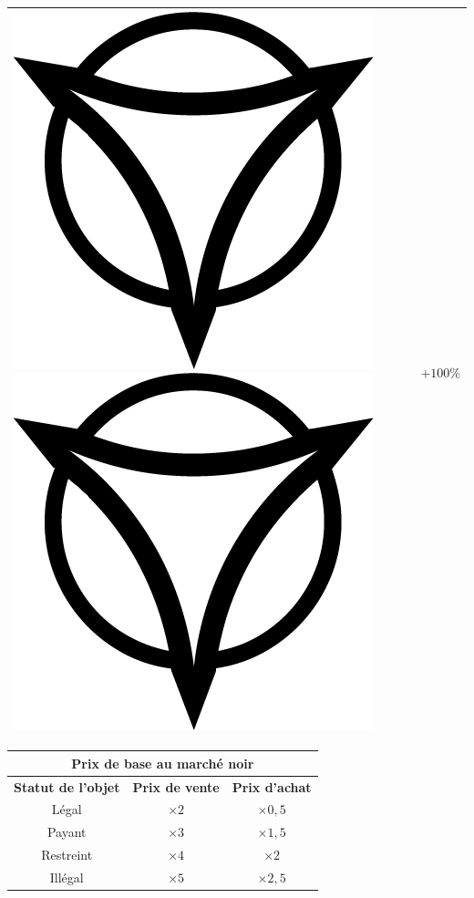 \documentclass{article}
\begin{document}
\begin{multicols}{2}
\begin{tabular}[b]{|p{5cm}|p{1cm}|}
		\hline 
		{\Large \includegraphics[height=\fontcharht\font`\B]{../img/result_desastre_despair} \includegraphics[height=\fontcharht\font`\B]{../img/result_desastre_despair}} & $+100\%$ \\ 
		\hline 
	\end{tabular} 
	\begin{tabular}{|c|c|c|}
		\hline 
		\multicolumn{3}{|c|}{\cellcolor{DarkRed} \textbf{{\large \textcolor{PureWhite}{Prix de base au marché noir}}}} \\ 
		\hline 
		\cellcolor{DarkGold}\textbf{Statut de l'objet} & \cellcolor{DarkGold}\textbf{Prix de vente} & \cellcolor{DarkGold}\textbf{Prix d'achat} \\ 
		\hline 
		Légal & $\times2$ & $\times0,5$ \\ 
		\hline 
		Payant & $\times3$ & $\times1,5$ \\ 
		\hline 
		Restreint & $\times4$ & $\times2$ \\ 
		\hline 
		Illégal & $\times5$ & $\times2,5$ \\ 
		\hline 
	\end{tabular}
\end{multicols}
\end{document}

